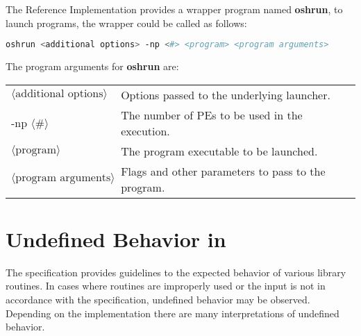 The  \openshmem{} Reference Implementation provides a wrapper program named
\textbf{oshrun}, to launch \openshmem programs, the wrapper could be called as
follows:

\begin{lstlisting}[language=bash]
oshrun <additional options> -np <#> <program> <program arguments>
\end{lstlisting}
The program arguments for \textbf{oshrun} are:

\begin{tabular}{p{}p{}}
$\langle\mbox{additional options}\rangle$ & {Options passed to the underlying launcher.}\tabularnewline
-np $\langle\mbox{\#}\rangle$ & {The number of \ac{PE}s to be used in the execution.}\tabularnewline
$\langle\mbox{program}\rangle$ & {The program executable to be launched.}\tabularnewline
$\langle\mbox{program arguments}\rangle$ & {Flags and other parameters to pass to the program.}\tabularnewline
\end{tabular}





\chapter{Undefined Behavior in \openshmem}\label{sec:undefined}

The specification provides guidelines to the expected behavior of
various library routines.  In cases where routines are improperly used
or the input is not in accordance with the specification, undefined
behavior may be observed.  Depending on the implementation there are
many interpretations of undefined behavior. 

$\;$

